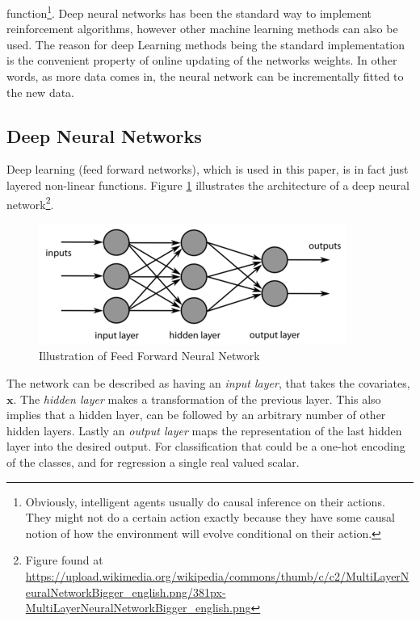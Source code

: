 function\footnote{Obviously, intelligent agents usually do causal inference on their actions. They might not do a certain action exactly because they have some causal notion of how the environment will evolve conditional on their action.}. Deep neural networks has been the standard way to implement reinforcement algorithms, however other machine learning methods can also be used. The reason for deep Learning methods being the standard implementation is the convenient property of online updating of the networks weights. In other words, as more data comes in, the neural network can be incrementally fitted to the new data.

\subsection{Deep Neural Networks}

Deep learning (feed forward networks), which is used in this paper, is in fact just layered non-linear functions. Figure \ref{fig:feedforwardnetwork} illustrates the architecture of a deep neural network\footnote{Figure found at \url{https://upload.wikimedia.org/wikipedia/commons/thumb/c/c2/MultiLayerNeuralNetworkBigger_english.png/381px-MultiLayerNeuralNetworkBigger_english.png}}.

\begin{figure}[ht]
    \centering
    \includegraphics[scale=0.6]{figures/feedforwardnetworkillustration.png}
    \caption{Illustration of Feed Forward Neural Network}
    \label{fig:feedforwardnetwork}
\end{figure}

The network can be described as having an \textit{input layer}, that takes the covariates, $\textbf{x}$. The \textit{hidden layer} makes a transformation of the previous layer. This also implies that a hidden layer, can be followed by an arbitrary number of other hidden layers. Lastly an \textit{output layer} maps the representation of the last hidden layer into the desired output. For classification that could be a one-hot encoding of the classes, and for regression a single real valued scalar.

